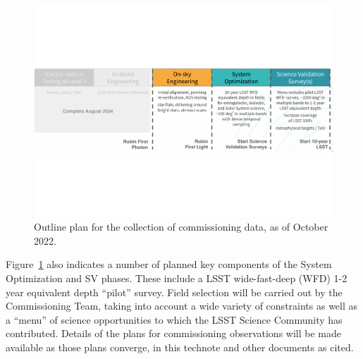 \begin{figure}[htb]
\centering
\includegraphics[width=0.95\linewidth]{figures/commissioning-plan}
\caption{Outline plan for the collection of commissioning data, as of October 2022.}
\label{fig:commissioning}
\end{figure}

Figure~\ref{fig:commissioning} also indicates a number of planned key components of the System Optimization and SV phases.
These include a LSST wide-fast-deep (WFD) 1-2 year equivalent depth ``pilot'' survey.
Field selection will be carried out by the Commissioning Team, taking into account a wide variety of constraints as well as a ``menu'' of science opportunities to which the LSST Science Community has contributed.
Details of the plans for commissioning observations will be made available as those plans converge, in this technote and other documents as cited.